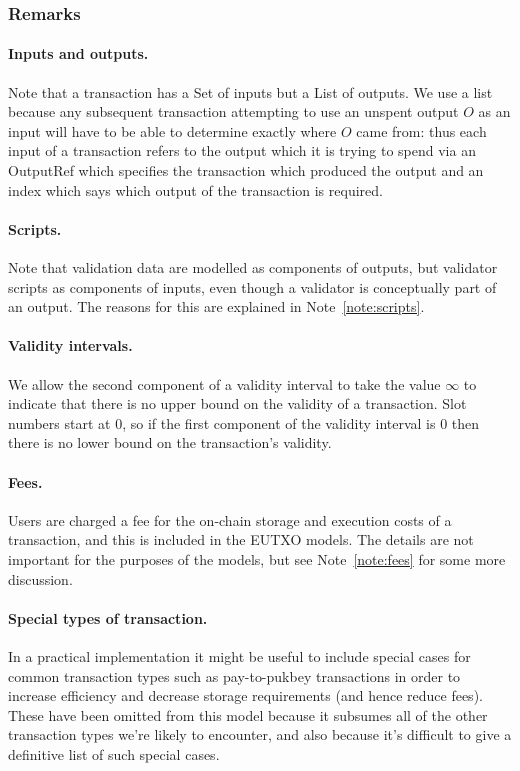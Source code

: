 \documentclass[a4paper]{article}
\newcounter{note}
\newcommand{\todompj}[1]{\todo[inline,color=yellow!40,author=Michael]{#1}}
\newcommand{\s}{\textsf}  %
\begin{document}
\subsubsection{Remarks}
\paragraph{Inputs and outputs. } Note that a transaction has a
\textsf{Set} of inputs but a \textsf{List} of outputs. We use a list
because any subsequent transaction attempting to use an unspent output
$O$ as an input will have to be able to determine exactly where $O$
came from: thus each input of a transaction refers to the output which
it is trying to spend via an \s{OutputRef} which specifies the
transaction which produced the output and an index which says which
output of the transaction is required.


\paragraph{Scripts.} Note that validation data are modelled as components
of outputs, but validator scripts as components of inputs, even though
a validator is conceptually part of an output.  The reasons for this
are explained in Note~\ref{note:scripts}.

\paragraph{Validity intervals.} We allow the second component of a
validity interval to take the value $\infty$ to indicate that there is
no upper bound on the validity of a transaction.  Slot numbers start
at 0, so if the first component of the validity interval is 0
then there is no lower bound on the transaction's validity.

\paragraph{Fees.}  Users are charged a fee for the on-chain storage
and execution costs of a transaction, and this is included in the
EUTXO models.  The details are not important for the purposes of the
models, but see Note~\ref{note:fees} for some more discussion.

\paragraph{Special types of transaction.} In a practical
implementation it might be useful to include special cases for common
transaction types such as pay-to-pukbey transactions in order to
increase efficiency and decrease storage requirements (and hence
reduce fees).  These have been omitted from this model because it
subsumes all of the other transaction types we're likely to encounter,
and also because it's difficult to give a definitive list of such
special cases.
\end{document}
